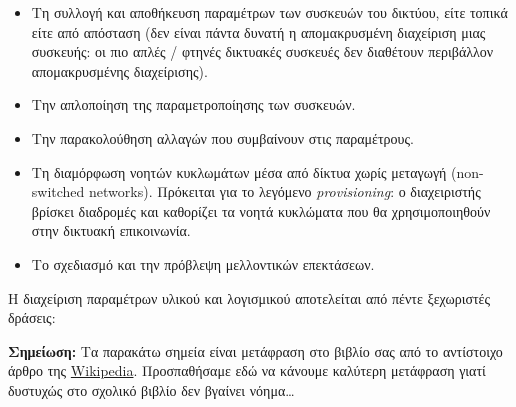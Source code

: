 \begin{itemize}
\item Τη συλλογή και αποθήκευση παραμέτρων των συσκευών του δικτύου, είτε τοπικά είτε από απόσταση (δεν είναι πάντα δυνατή η απομακρυσμένη διαχείριση μιας συσκευής: οι πιο απλές / φτηνές δικτυακές συσκευές δεν διαθέτουν περιβάλλον απομακρυσμένης διαχείρισης).
\item Την απλοποίηση της παραμετροποίησης των συσκευών.
\item Την παρακολούθηση αλλαγών που συμβαίνουν στις παραμέτρους.
\item Τη διαμόρφωση νοητών κυκλωμάτων μέσα από δίκτυα χωρίς μεταγωγή (non-switched networks). Πρόκειται για το λεγόμενο \emph{provisioning}: ο διαχειριστής βρίσκει διαδρομές και καθορίζει τα νοητά κυκλώματα που θα χρησιμοποιηθούν στην δικτυακή επικοινωνία.
\item Το σχεδιασμό και την πρόβλεψη μελλοντικών επεκτάσεων.
\end{itemize}

Η διαχείριση παραμέτρων υλικού και λογισμικού αποτελείται από πέντε ξεχωριστές δράσεις:

\begin{inthebox}
\textbf{Σημείωση:} Τα παρακάτω σημεία είναι μετάφραση στο βιβλίο σας από το αντίστοιχο άρθρο της \href{https://en.wikipedia.org/wiki/Configuration_management}{Wikipedia}. Προσπαθήσαμε εδώ να κάνουμε καλύτερη μετάφραση γιατί δυστυχώς στο σχολικό βιβλίο δεν βγαίνει νόημα\ldots\\
\end{inthebox}

